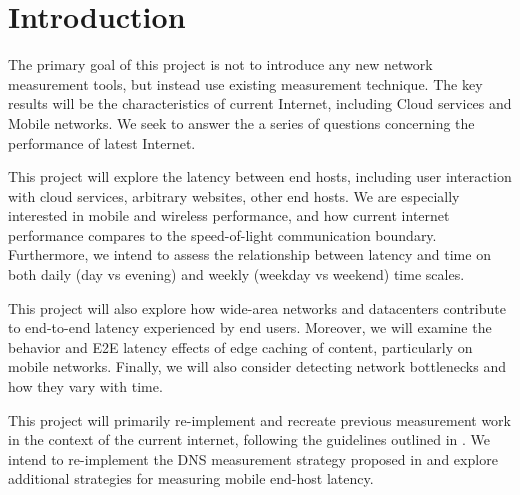 
\section{Introduction}
\label{sec:introduction}
The primary goal of this project is not to introduce any new network measurement tools, but instead use existing measurement technique. The key results will be the characteristics of current Internet, including Cloud services and Mobile networks. We seek to answer the a series of questions concerning the performance of latest Internet.

This project will explore the latency between end hosts, including user interaction with cloud services, arbitrary websites, other end hosts. We are especially interested in mobile and wireless performance, and how current internet performance compares to the speed-of-light communication boundary. Furthermore, we intend to assess the relationship between latency and time on both daily (day vs evening) and weekly (weekday vs weekend) time scales.

This project will also explore how wide-area networks and datacenters contribute to end-to-end latency experienced by end users. Moreover, we will examine the behavior and E2E latency effects of edge caching of content, particularly on mobile networks. Finally, we will also consider detecting network bottlenecks and how they vary with time.

This project will primarily re-implement and recreate previous measurement work in the context of the current internet,  following the guidelines outlined in \cite{paxson2004strategies}. We intend to re-implement the DNS measurement strategy proposed in \cite{gummadi2002king} and explore additional strategies for measuring mobile end-host latency.

